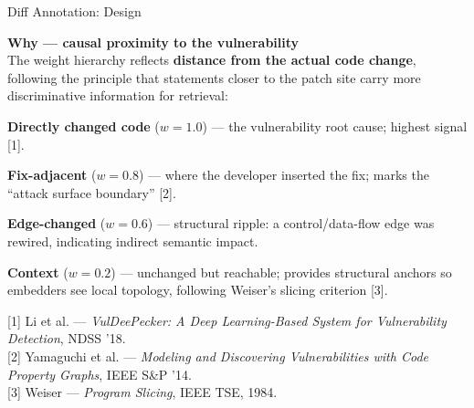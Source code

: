 \documentclass[aspectratio=169,10pt]{beamer}
\begin{document}
\begin{frame}{Diff Annotation: Design}

  \textbf{Why — causal proximity to the vulnerability}\\[3pt]
  The weight hierarchy reflects \textbf{distance from the actual
  code change}, following the principle that statements closer
  to the patch site carry more discriminative information for
  retrieval:

  \vspace{0.3em}
  \begin{enumerate}\setlength{\itemsep}{3pt}
    {\small
    \item \textbf{Directly changed code} ($w = 1.0$) —
          the vulnerability root cause; highest signal [1].
    \item \textbf{Fix-adjacent} ($w = 0.8$) —
          where the developer inserted the fix; marks the
          ``attack surface boundary'' [2].
    \item \textbf{Edge-changed} ($w = 0.6$) —
          structural ripple: a control/data-flow edge was
          rewired, indicating indirect semantic impact.
    \item \textbf{Context} ($w = 0.2$) —
          unchanged but reachable; provides structural
          anchors so embedders see local topology, following
          Weiser's slicing criterion [3].}
  \end{enumerate}

  \vspace{0.3em}
  {\scriptsize\color{black!55}
  [1] Li et al. — \emph{VulDeePecker: A Deep Learning-Based System
  for Vulnerability Detection}, NDSS '18.\\[1pt]
  [2] Yamaguchi et al. — \emph{Modeling and Discovering
  Vulnerabilities with Code Property Graphs}, IEEE S\&P '14.\\[1pt]
  [3] Weiser — \emph{Program Slicing}, IEEE TSE, 1984.}

\end{frame}
\end{document}
